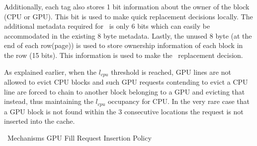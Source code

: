 Additionally, each tag also stores 1 bit information about the owner of the block (CPU or GPU). This bit is used to make quick replacement decisions locally. The additional metadata required for \chaining\ is only 6 bits which can easily be accommodated in the existing 8 byte metadata. Lastly, the unused 8 byte (at the end of each row(page)) is used to store ownership information of each block in the row (15 bits). This information is used to make the \chaining\ replacement decision.


\par As explained earlier, when the \textit{$l_{cpu}$} threshold is reached, GPU lines are not allowed to evict CPU blocks and such GPU requests contending to evict a CPU line are forced to chain to another block belonging to a GPU and evicting that instead, thus maintaining the \textit{$l_{cpu}$} occupancy for CPU. In the very rare case that a GPU block is not found within the 3 consecutive locations the request is not inserted into the cache.

\begin{table}[htb]
	\centering
	
	\caption{\chaining\ Mechanisms GPU Fill Request Insertion Policy}
	\label{chaining-replacement}
\end{table}

